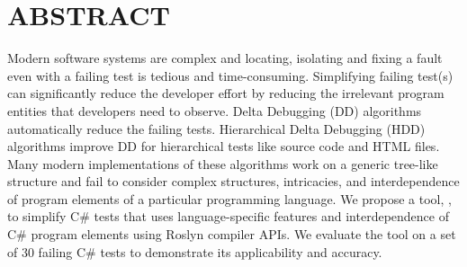
\chapter*{ABSTRACT}
\vspace{7mm}

Modern software systems are complex and locating, isolating and fixing a fault even with a failing test is tedious and time-consuming. Simplifying failing test(s) can significantly reduce the developer effort by reducing the irrelevant program entities that developers need to observe. Delta Debugging (DD) algorithms automatically reduce the failing tests. Hierarchical Delta Debugging (HDD) algorithms improve DD for hierarchical tests like source code and HTML files. Many modern implementations of these algorithms work on a generic tree-like structure and fail to consider complex structures, intricacies, and interdependence of program elements of a particular programming
language. We propose a tool, \mytool, to simplify C\# tests that uses language-specific features and interdependence of C\# program elements using Roslyn compiler APIs. We evaluate the tool on a set of 30 failing C\# tests to demonstrate its applicability and accuracy.     

 